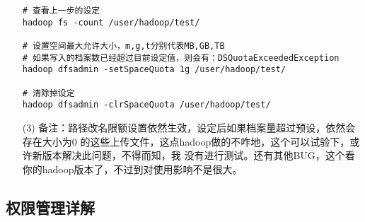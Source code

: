 \documentclass{article}
\begin{document}
\begin{itemize}
\begin{verbatim}
# 查看上一步的设定
hadoop fs -count /user/hadoop/test/

# 设置空间最大允许大小，m,g,t分别代表MB,GB,TB
# 如果写入的档案数已经超过目前设定值，则会有：DSQuotaExceededException
hadoop dfsadmin -setSpaceQuota 1g /user/hadoop/test/

# 清除掉设定
hadoop dfsadmin -clrSpaceQuota /user/hadoop/test/
\end{verbatim}

\item[(3)] 备注：路径改名限额设置依然生效，设定后如果档案量超过预设，依然会存在大小为0
的这些上传文件，这点hadoop做的不咋地，这个可以试验下，或许新版本解决此问题，不得而知，我
没有进行测试。还有其他BUG，这个看你的hadoop版本了，不过到对使用影响不是很大。

\end{itemize}

\subsection{权限管理详解}
\label{pri:1}
\end{document}
